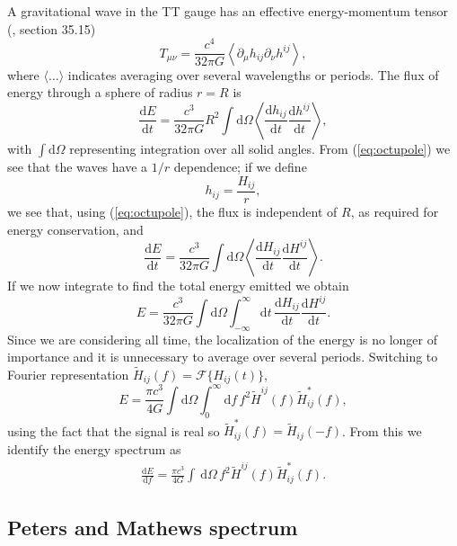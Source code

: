 \documentclass[useAMS,usedcolumn,usegraphicx,usenatbib]{mn2e}
\newcommand{\eqnref}[1]{(\ref{eq:#1})}
\newcommand{\dd}{\ensuremath{\mathrm{d}}}
\newcommand{\diff}[2]{\ensuremath{\frac{\dd {#1}}{\dd {#2}}}}
\newcommand{\intd}[4]{\ensuremath{\int_{#1}^{#2}{#3}\,\dd{#4}}}
\begin{document}
A gravitational wave in the TT gauge has an effective energy-momentum tensor (\citealt{Misner1973}, section 35.15)
\begin{equation}
T_{\mu\nu} = \frac{c^4}{32\pi G}\left\langle\partial_\mu h_{ij} \partial_\nu h^{ij}\right\rangle,
\end{equation}
where $\langle\ldots\rangle$ indicates averaging over several wavelengths or periods. The flux of energy through a sphere of radius $r = R$ is
\begin{equation}
\diff{E}{t} = \frac{c^3}{32\pi G} R^2 \int{\dd\Omega}\left\langle\diff{h_{ij}}{t}\diff{h^{ij}}{t}\right\rangle,
\end{equation}
with $\int{\dd\Omega}$ representing integration over all solid angles. From \eqnref{octupole} we see that the waves have a $1/{r}$ dependence; if we define
\begin{equation}
h_{ij} = \frac{H_{ij}}{r},
\end{equation}
we see that, using \eqnref{octupole}, the flux is independent of $R$, as required for energy conservation, and
\begin{equation}
\diff{E}{t} = \frac{c^3}{32\pi G} \int{\dd\Omega}\left\langle\diff{H_{ij}}{t}\diff{H^{ij}}{t}\right\rangle.
\end{equation}
If we now integrate to find the total energy emitted we obtain
\begin{equation}
E = \frac{c^3}{32\pi G} \int{\dd\Omega}\int_{-\infty}^{\infty}{\dd t} \, \diff{H_{ij}}{t}\diff{H^{ij}}{t}.
\label{eq:integrate_E}
\end{equation}
Since we are considering all time, the localization of the energy is no longer of importance and it is unnecessary to average over several periods. Switching to Fourier representation $\widetilde{H}_{ij}(f) = \mathscr{F}\{H_{ij}(t)\}$,
\begin{equation}
E = \frac{\pi c^3}{4 G} \int{\dd\Omega}\int_{0}^{\infty}{\dd f} \, f^2 \widetilde{H}^{ij}(f)\widetilde{H}_{ij}^*(f),
\label{eq:total_E}
\end{equation}
using the fact that the signal is real so $\widetilde{H}_{ij}^*(f) = \widetilde{H}_{ij}(-f)$. From this we identify the energy spectrum as
\begin{align}
\diff{E}{f} = \frac{\pi c^3}{4 G} \intd{}{}{}{\Omega} \, f^2 \widetilde{H}^{ij}(f)\widetilde{H}_{ij}^*(f).
\label{eq:NK_dEdf}
\end{align}

\subsection{Peters and Mathews spectrum}
\end{document}

